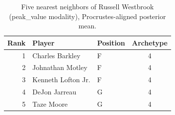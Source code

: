 \begin{table}[htbp]
  \centering\small
  \begin{tabular}{rllc}
    \toprule
    Rank & Player & Position & Archetype \\
    \midrule
    1 & Charles Barkley & F & 4 \\
    2 & Johnathan Motley & F & 4 \\
    3 & Kenneth Lofton Jr. & F & 4 \\
    4 & DeJon Jarreau & G & 4 \\
    5 & Taze Moore & G & 4 \\
    \bottomrule
  \end{tabular}
  \caption{Five nearest neighbors of Russell Westbrook (peak_value modality), Procrustes-aligned posterior mean.}
  \label{tab:Russell_Westbrook_neighbors_peak_value}
\end{table}

